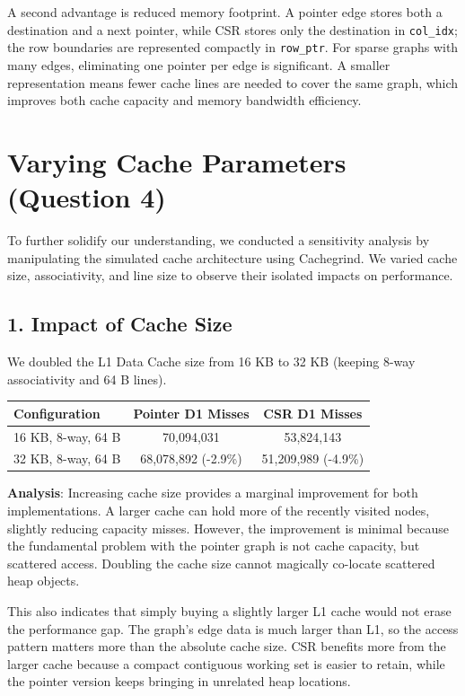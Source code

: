 \documentclass[11pt]{article}
\begin{document}
A second advantage is reduced memory footprint. A pointer edge stores both a destination and a next pointer, while CSR stores only the destination in \texttt{col\_idx}; the row boundaries are represented compactly in \texttt{row\_ptr}. For sparse graphs with many edges, eliminating one pointer per edge is significant. A smaller representation means fewer cache lines are needed to cover the same graph, which improves both cache capacity and memory bandwidth efficiency.

\section{Varying Cache Parameters (Question 4)}

To further solidify our understanding, we conducted a sensitivity analysis by manipulating the simulated cache architecture using Cachegrind. We varied cache size, associativity, and line size to observe their isolated impacts on performance.

\subsection{1. Impact of Cache Size}
We doubled the L1 Data Cache size from 16 KB to 32 KB (keeping 8-way associativity and 64 B lines).

\begin{table}[H]
\centering
\begin{tabular}{@{}lcc@{}}
\toprule
\textbf{Configuration} & \textbf{Pointer D1 Misses} & \textbf{CSR D1 Misses} \\ \midrule
16 KB, 8-way, 64 B & 70,094,031 & 53,824,143 \\
32 KB, 8-way, 64 B & 68,078,892 (-2.9\%) & 51,209,989 (-4.9\%) \\ \bottomrule
\end{tabular}
\end{table}

\textbf{Analysis}: Increasing cache size provides a marginal improvement for both implementations. A larger cache can hold more of the recently visited nodes, slightly reducing capacity misses. However, the improvement is minimal because the fundamental problem with the pointer graph is not cache capacity, but scattered access. Doubling the cache size cannot magically co-locate scattered heap objects.

This also indicates that simply buying a slightly larger L1 cache would not erase the performance gap. The graph's edge data is much larger than L1, so the access pattern matters more than the absolute cache size. CSR benefits more from the larger cache because a compact contiguous working set is easier to retain, while the pointer version keeps bringing in unrelated heap locations.
\end{document}
